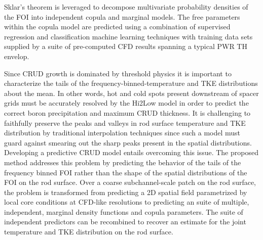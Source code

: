 Sklar's theorem is leveraged to decompose multivariate probability
densities of the FOI into independent copula and marginal models. The free parameters
within the copula model are predicted using a combination of supervised
regression and classification machine learning techniques with training data
sets supplied by a suite of pre-computed CFD results spanning a typical PWR TH
envelop. 

Since CRUD growth is dominated by threshold physics
it is important to characterize the tails of the
frequency-binned-temperature and TKE distributions about the mean.  In other
words, hot and cold spots present downstream of spacer grids must be accurately
resolved by the Hi2Low model in order to predict the correct boron
precipitation and maximum CRUD thickness.
It is challenging to faithfully
preserve the peaks and valleys in rod surface temperature and TKE distribution
by traditional interpolation techniques since such a model must guard against
smearing out the sharp peaks present in the spatial distributions.  Developing
a predictive CRUD model entails overcoming this issue. The proposed method
addresses this problem by predicting the behavior of the tails of the frequency
binned FOI rather than the shape of the spatial distributions of the FOI on
the rod surface.  Over a coarse subchannel-scale patch on the rod surface, the
problem is transformed from predicting a 2D spatial field parametrized by local core conditions at CFD-like resolutions to
predicting an suite of multiple, independent, marginal density functions and copula parameters.  The suite of independent predictors can be recombined to recover an estimate for the joint temperature and TKE distribution on the rod surface.
